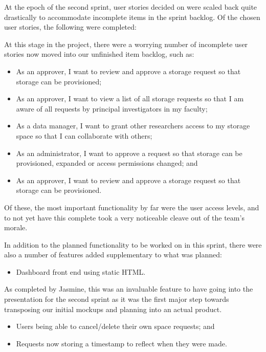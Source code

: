 \documentclass[a4paper,titlepage,12pt]{article}
\begin{document}
At the epoch of the second sprint, user stories decided on were scaled back
quite drastically to accommodate incomplete items in the sprint backlog. Of the
chosen user stories, the following were completed:

At this stage in the project, there were a worrying number of incomplete user
stories now moved into our unfinished item backlog, such as:

\begin{itemize}
	\item As an approver, I want to review and approve a storage request so
	      that storage can be provisioned;
	\item As an approver, I want to view a list of all storage requests so
	      that I am aware of all requests by principal investigators in my
	      faculty;
	\item As a data manager, I want to grant other researchers access to my
	      storage space so that I can collaborate with others;
	\item As an administrator, I want to approve a request so that storage
	      can be provisioned, expanded or access permissions changed; and
	\item As an approver, I want to review and approve a storage request so
	      that storage can be provisioned.
\end{itemize}

Of these, the most important functionality by far were the user access levels,
and to not yet have this complete took a very noticeable cleave out of the
team's morale.

In addition to the planned functionality to be worked on in this sprint, there
were also a number of features added supplementary to what was planned:

\begin{itemize}
	\item Dashboard front end using static HTML.
\end{itemize}

As completed by Jasmine, this was an invaluable feature to have going into the
presentation for the second sprint as it was the first major step towards
transposing our initial mockups and planning into an actual product.

\begin{itemize}
	\item Users being able to cancel/delete their own space requests; and
	\item Requests now storing a timestamp to reflect when they were made.
\end{itemize}
\end{document}

